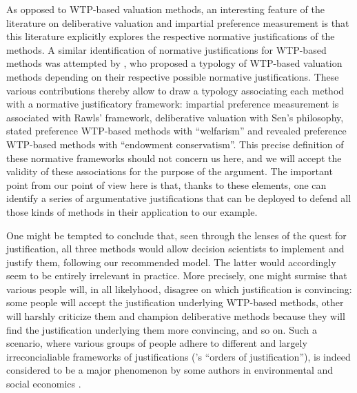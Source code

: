 \documentclass[preprint, french, english, 11pt]{elsarticle}%
\begin{document}
As opposed to WTP-based valuation methods, an interesting feature of the literature on deliberative valuation and impartial preference measurement is that this literature explicitly explores the respective normative justifications of the methods. A similar identification of normative justifications for WTP-based methods was attempted by \citep{meinard_ethical_2016}, who proposed a typology of WTP-based valuation methods depending on their respective possible normative justifications. These various contributions thereby allow to draw a typology associating each method with a normative justificatory framework: impartial preference measurement is associated with Rawls' framework, deliberative valuation with Sen's philosophy, stated preference WTP-based methods with ``welfarism'' and revealed preference WTP-based methods with ``endowment conservatism''. This precise definition of these normative frameworks should not concern us here, and we will accept the validity of these associations for the purpose of the argument. The important point from our point of view here is that, thanks to these elements, one can identify a series of argumentative justifications that can be deployed to defend all those kinds of methods in their application to our example.

One might be tempted to conclude that, seen through the lenses of the quest for justification, all three methods would allow decision scientists to implement and justify them, following our recommended model. The latter would accordingly seem to be entirely irrelevant in practice. More precisely, one might surmise that various people will, in all likelyhood, disagree on which justification is convincing: some people will accept the justification underlying WTP-based methods, other will harshly criticize them and champion deliberative methods because they will find the justification underlying them more convincing, and so on. Such a scenario, where various groups of people adhere to different and largely irreconcialiable frameworks of justifications (\citep{boltanski_justification_2006}'s ``orders of justification''), is indeed considered to be a major phenomenon by some authors in environmental and social economics \citep{chateauraynaud_contrainte_2007}.
\end{document}
